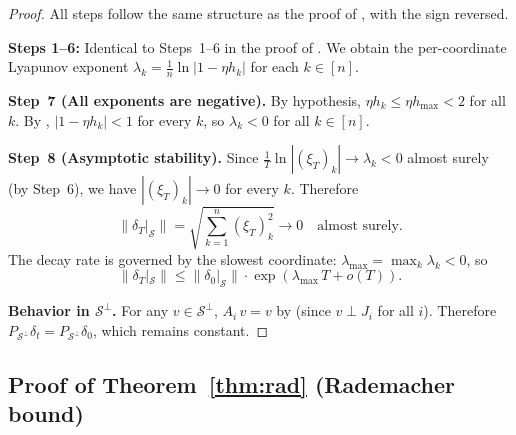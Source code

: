 \documentclass[11pt,a4paper]{article}
\theoremstyle{definition}
\theoremstyle{remark}
\newcommand{\cS}{\mathcal{S}}
\begin{document}
\begin{proof}
All steps follow the same structure as the proof of , with the
sign reversed.

\textbf{Steps 1--6:}\;
Identical to Steps~1--6 in the proof of .  We obtain the
per-coordinate Lyapunov exponent
$\lambda_k = \frac{1}{n}\ln|1 - \eta h_k|$ for each $k \in [n]$.

\textbf{Step~7 (All exponents are negative).}\;
By hypothesis, $\eta h_k \leq \eta h_{\max} < 2$ for all $k$.  By ,
$|1 - \eta h_k| < 1$ for every $k$, so $\lambda_k < 0$ for all $k \in [n]$.

\textbf{Step~8 (Asymptotic stability).}\;
Since $\frac{1}{T}\ln|(\xi_T)_k| \to \lambda_k < 0$ almost surely (by Step~6),
we have $|(\xi_T)_k| \to 0$ for every $k$.  Therefore
\[
  \|\delta_T|_{\cS}\| = \sqrt{\sum_{k=1}^n (\xi_T)_k^2} \to 0
  \quad \text{almost surely.}
\]
The decay rate is governed by the slowest coordinate:
$\lambda_{\max} = \max_k \lambda_k < 0$, so
\[
  \|\delta_T|_{\cS}\| \leq \|\delta_0|_{\cS}\| \cdot
  \exp(\lambda_{\max}\, T + o(T)).
\]

\textbf{Behavior in $\cS^\perp$.}\;
For any $v \in \cS^\perp$, $A_i\, v = v$ by  (since
$v \perp J_i$ for all $i$).  Therefore
$P_{\cS^\perp}\delta_t = P_{\cS^\perp}\delta_0$, which remains constant.
\end{proof}

\subsection{Proof of Theorem~\ref{thm:rad} (Rademacher bound)}
\end{document}
